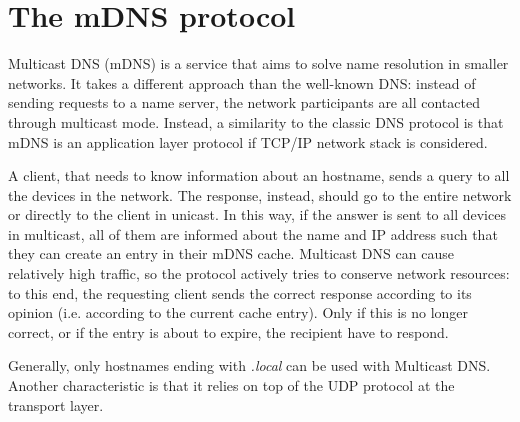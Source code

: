 \documentclass[fleqn, 11pt]{SelfArx} %
\begin{document}

\section{The mDNS protocol}
Multicast DNS (mDNS) is a service that aims to solve name resolution in smaller networks. It takes a different approach than the well-known DNS: instead of sending requests to a name server, the network participants are all contacted through multicast mode. \newline
Instead, a similarity to the classic DNS protocol is that mDNS is an application layer protocol if TCP/IP network stack is considered. \newline %


A client, that needs to know information about an hostname, sends a query to all the devices in the network. The response, instead, should go to the entire network or directly to the client in unicast. In this way, if the answer is sent to all devices in multicast, all of them are informed about the name and IP address such that they can create an entry in their mDNS cache. \newline
Multicast DNS can cause relatively high traffic, so the protocol actively tries to conserve network resources: to this end, the requesting client sends the correct response according to its opinion (i.e. according to the current cache entry). Only if this is no longer correct, or if the entry is about to expire, the recipient have to respond. \newline

Generally, only hostnames ending with {\it{.local}} can be used with Multicast DNS. Another characteristic is that it relies on top of the UDP protocol at the transport layer.\newline
\end{document}
